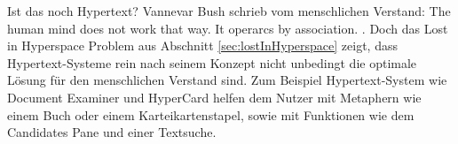 \begin{section}{Ist das noch Hypertext?}
Vannevar Bush schrieb vom menschlichen Verstand: \glqq The human mind does not work that way. It operarcs by association.\grqq{ }\cite{Bush1945} \cite{Life1945}. Doch das Lost in Hyperspace Problem aus Abschnitt \ref{sec:lostInHyperspace} zeigt, dass Hypertext-Systeme rein nach seinem Konzept nicht unbedingt die optimale Lösung für den menschlichen Verstand sind. Zum Beispiel Hypertext-System wie Document Examiner und HyperCard helfen dem Nutzer mit Metaphern wie einem Buch oder einem Karteikartenstapel, sowie mit Funktionen wie dem Candidates Pane und einer Textsuche.

\end{section}